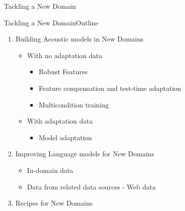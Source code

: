 \begin{frame}
  \begin{center}
    {\color{Maroon}\Huge Tackling a New Domain}
  \end{center}
\end{frame}

\begin{frame}{Tackling a New Domain}{Outline}
  \begin{enumerate}
  \item Building Acoustic models in New Domains
    \begin{itemize}
    \item With no adaptation data
	\begin{itemize}
	  \item Robust Features
	  \item Feature compensation and test-time adaptation
          \item Multicondition training
	\end{itemize}
    \item With adaptation data
	\begin{itemize}
         \item Model adaptation
        \end{itemize}
    \end{itemize}
  \item Improving Language models for New Domains
    \begin{itemize}
    \item In-domain data
    \item Data from related data sources - Web data
    \end{itemize}
  \item Recipes for New Domains
  \end{enumerate}
\end{frame}



